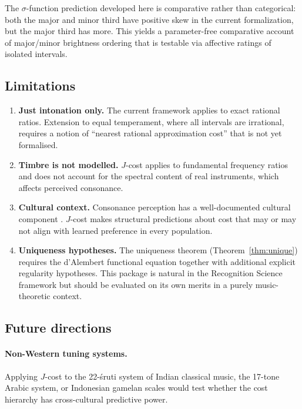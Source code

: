 \documentclass[11pt,a4paper]{article}
\begin{document}
The $\sigma$-function prediction developed here is comparative rather
than categorical: both the major and minor third have positive skew in
the current formalization, but the major third has more.  This yields a
parameter-free comparative account of major/minor brightness ordering
that is testable via affective ratings of isolated intervals.

\subsection{Limitations}

\begin{enumerate}
  \item \textbf{Just intonation only.}  The current framework applies
    to exact rational ratios.  Extension to equal temperament, where
    all intervals are irrational, requires a notion of ``nearest
    rational approximation cost'' that is not yet formalised.

  \item \textbf{Timbre is not modelled.}  $J$-cost applies to
    fundamental frequency ratios and does not account for the spectral
    content of real instruments, which affects perceived consonance.

  \item \textbf{Cultural context.}  Consonance perception has a
    well-documented cultural component \citep{mcdermott2016}.  $J$-cost
    makes structural predictions about cost that may or may not align
    with learned preference in every population.

  \item \textbf{Uniqueness hypotheses.}  The uniqueness theorem
    (Theorem~\ref{thm:unique}) requires the d'Alembert functional
    equation together with additional explicit regularity hypotheses.
    This package is natural in the Recognition Science framework but
    should be evaluated on its own merits in a purely music-theoretic
    context.
\end{enumerate}

\subsection{Future directions}

\paragraph{Non-Western tuning systems.}
Applying $J$-cost to the 22-\'{s}ruti system of Indian classical music,
the 17-tone Arabic system, or Indonesian gamelan scales would test
whether the cost hierarchy has cross-cultural predictive power.
\end{document}
